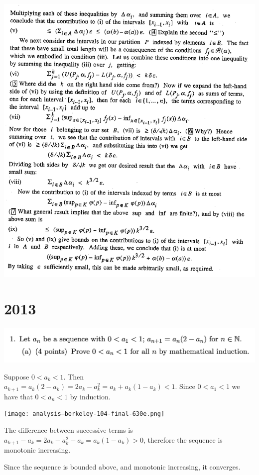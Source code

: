 \includegraphics[width=400pt]{img/analysis--berkeley-104-final--spring-2006-9a48.png}




\section{2013}

\includegraphics[width=400pt]{img/analysis--berkeley-104-final-1f72.png}

Suppose $0 < a_k < 1$. Then $a_{k+1} = a_k(2 - a_k) = 2a_k - a_k^2 = a_k + a_k(1 - a_k) < 1$.
Since $0 < a_1 < 1$ we have that $0 < a_n < 1$ by induction.


\texttt{[image: analysis--berkeley-104-final-630e.png]}

The difference between successive terms is $a_{k+1} - a_k = 2a_k - a_k^2 - a_k = a_k(1 - a_k) > 0$, therefore
the sequence is monotonic increasing.

Since the sequence is bounded above, and monotonic increasing, it converges.


